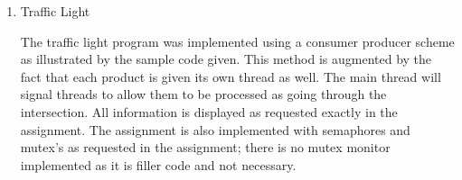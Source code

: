 \documentclass[a4paper,11pt]{article}
\theoremstyle{mytheor}
\begin{document}
\begin{enumerate}
\item Traffic Light \par 

    The traffic light program was implemented using a consumer producer scheme as illustrated by the sample code given. This method is augmented by the fact that each product is given its own thread as well. The main thread will signal threads to allow them to be processed as going through the intersection. All information is displayed as requested exactly in the assignment. The assignment is also implemented with semaphores and mutex's as requested in the assignment; there is no mutex monitor implemented as it is filler code and not necessary.

\end{enumerate}
\end{document}
